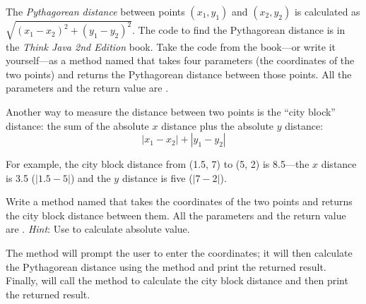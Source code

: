\begin{exercise}
The {\em Pythagorean distance} between points $(x_1, y_1)$ and $(x_2, y_2)$ is calculated as $\sqrt {(x_1-x_2)^2 + (y_1-y_2)^2}$. The code to find the Pythagorean distance is in the {\em Think Java 2nd Edition} book. Take the code from the book---or write it yourself---as a method named  that takes four parameters (the coordinates of the two points) and returns the Pythagorean distance between those points. All the parameters and the return value are .

Another way to measure the distance between two points is the ``city block'' distance: the sum of the absolute $x$ distance plus the absolute $y$ distance:
\begin{equation*}
|x_1 - x_2| + |y_1 - y_2|
\end{equation*}

For example, the city block distance from (1.5, 7) to (5, 2) is 8.5---the $x$ distance is 3.5 ($|1.5 - 5|$) and the $y$ distance is five ($|7 - 2|$).

Write a method named  that takes the coordinates of the two points and returns the city block distance between them. All the parameters and the return value are . {\em Hint}: Use  to calculate absolute value.

The  method will prompt the user to enter the coordinates; it will then calculate the Pythagorean distance using the  method and print the returned result. Finally,  will call the  method to calculate the city block distance and then print the returned result.
\end{exercise}

